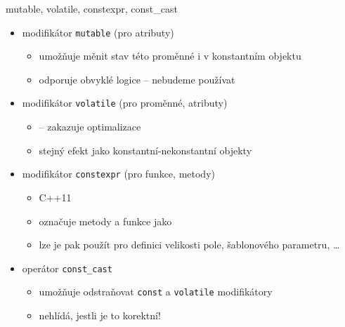 \begin{frame}[fragile]
\begin{bonusblock}{mutable, volatile, constexpr, const\_cast}
\begin{itemize}
\item modifikátor \lstinline|mutable| (pro atributy)
\begin{itemize}
\item umožňuje měnit stav této proměnné i v konstantním objektu
\item odporuje obvyklé logice -- nebudeme používat
\end{itemize}

\item modifikátor \lstinline|volatile| (pro proměnné, atributy)
\begin{itemize}
\item {} -- zakazuje optimalizace
\item stejný efekt jako konstantní-nekonstantní objekty
\end{itemize}

\item modifikátor \lstinline|constexpr| (pro funkce, metody)
\begin{itemize}
\item C++11
\item označuje metody a funkce jako 
\item lze je pak použít pro definici velikosti pole, šablonového parametru, \ldots
\end{itemize}

\item operátor \lstinline|const_cast|
\begin{itemize}
\item umožňuje odstraňovat \lstinline|const| a \lstinline|volatile| modifikátory
\item nehlídá, jestli je to korektní!
\end{itemize}
\end{itemize}
\end{bonusblock}
\end{frame}
